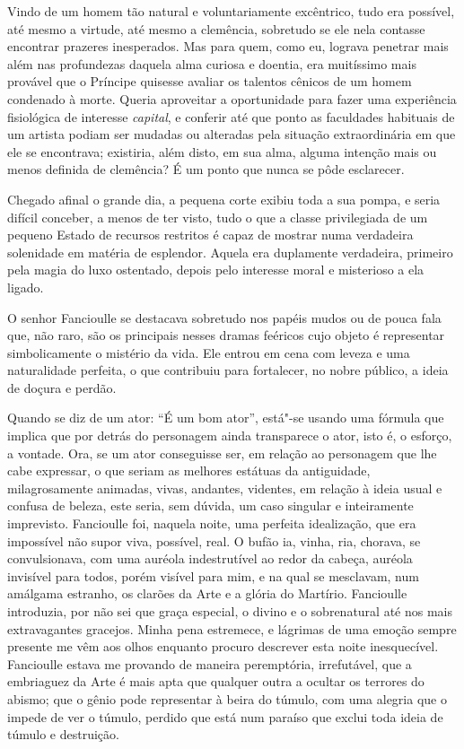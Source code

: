 Vindo de um homem tão natural e voluntariamente excêntrico, tudo era
possível, até mesmo a virtude, até mesmo a clemência, sobretudo se ele nela 
contasse encontrar prazeres inesperados. Mas para quem,
como eu, lograva penetrar mais além nas profundezas daquela
alma curiosa e doentia, era muitíssimo mais provável que o Príncipe
quisesse avaliar os talentos cênicos de um homem condenado à
morte. Queria aproveitar a oportunidade para fazer uma experiência
fisiológica de interesse \textit{capital}, e conferir até que ponto as
faculdades habituais de um artista podiam ser mudadas ou alteradas
pela situação extraordinária em que ele se encontrava;
existiria, além disto, em sua alma, alguma intenção mais ou menos definida
de clemência? É um ponto que nunca se pôde esclarecer.

Chegado afinal o grande dia, a pequena corte exibiu toda a sua pompa,
e seria difícil conceber, a menos de ter visto, tudo o que a classe
privilegiada de um pequeno Estado de recursos restritos é capaz de mostrar
numa verdadeira solenidade em matéria de esplendor. Aquela era duplamente
verdadeira, primeiro pela magia do luxo ostentado, depois pelo
interesse moral e misterioso a ela ligado.

O senhor Fancioulle se destacava sobretudo nos papéis mudos ou de
pouca fala que, não raro, são os principais nesses dramas feéricos
cujo objeto é representar simbolicamente o mistério da vida. Ele entrou
em cena com leveza e uma naturalidade perfeita, o que contribuiu
para fortalecer, no nobre público, a ideia de doçura e perdão.

Quando se diz de um ator: “É um bom ator'',
está"-se usando uma fórmula que implica que por detrás do personagem
ainda transparece o ator, isto é, o esforço, a vontade. Ora, se um ator
conseguisse ser, em relação ao personagem que lhe cabe expressar,
o que seriam as melhores estátuas da antiguidade, milagrosamente
animadas, vivas, andantes, videntes, em relação à ideia usual e
confusa de beleza, este seria, sem dúvida, um caso singular e
inteiramente imprevisto. Fancioulle foi, naquela noite, uma perfeita
idealização, que era impossível não supor viva, possível, real. O bufão
ia, vinha, ria, chorava, se convulsionava, com uma auréola indestrutível
ao redor da cabeça, auréola invisível para todos, porém visível para mim,
e na qual se mesclavam, num amálgama estranho, os clarões da Arte e a
glória do Martírio. Fancioulle introduzia, por não sei que graça
especial, o divino e o sobrenatural até nos mais extravagantes
gracejos. Minha pena estremece, e lágrimas de uma emoção sempre
presente me vêm aos olhos enquanto procuro descrever esta noite
inesquecível. Fancioulle estava me provando de maneira peremptória,
irrefutável, que a embriaguez da Arte é mais apta que qualquer
outra a ocultar os terrores do abismo; que o gênio pode representar
à beira do túmulo, com uma alegria que o impede de ver o túmulo,
perdido que está num paraíso que exclui toda ideia de túmulo e destruição.

